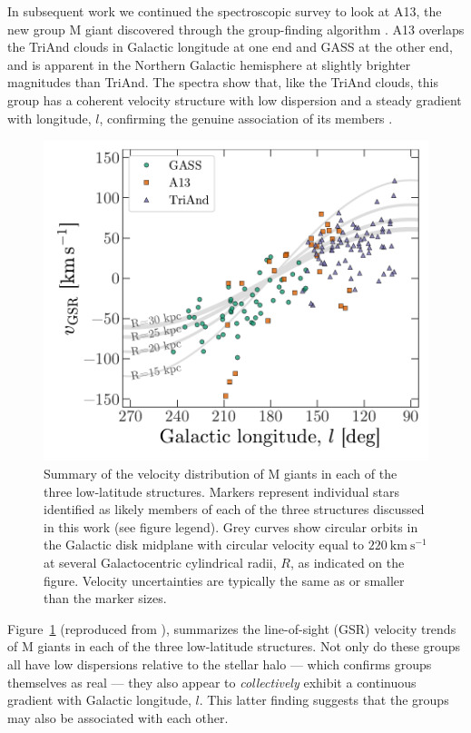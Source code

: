 \documentclass[galaxies,article,submit,moreauthors,pdftex,10pt,a4paper]{mdpi}
\newcommand{\kms}{\mathrm{km}~\mathrm{s}^{-1}}
\begin{document}
In subsequent work we continued the spectroscopic survey to look at A13, the new group M giant discovered through the group-finding algorithm \cite{sharma10}. A13 overlaps the TriAnd clouds in Galactic longitude at one end and GASS at the other end, and is apparent in the Northern Galactic hemisphere at slightly brighter magnitudes than TriAnd. The spectra show that, like the TriAnd clouds, this group has a coherent velocity structure with low dispersion and a steady gradient with longitude, $l$, confirming the genuine association of its members \cite{li17}.

\begin{figure}[!ht]
\centering
\includegraphics[width=5 in]{figures/vgsr.pdf}
\caption{\label{fig:ting_vel}
Summary of the velocity distribution of M giants in each of the three
low-latitude structures.
Markers represent individual stars identified as likely members of each of the
three structures discussed in this work (see figure legend).
Grey curves show circular orbits in the Galactic disk midplane with circular
velocity equal to $220~\kms$ at several Galactocentric cylindrical radii, $R$,
as indicated on the figure.
Velocity uncertainties are typically the same as or smaller than the marker
sizes.
}
\end{figure}


Figure~\ref{fig:ting_vel} (reproduced from \cite{li17}), summarizes the line-of-sight (GSR) velocity trends of M giants in each of the three low-latitude structures.
Not only do these groups all have low dispersions relative to the stellar halo
--- which confirms  groups themselves as real --- they also
appear to {\it collectively} exhibit a continuous gradient with Galactic longitude,
$l$.
This latter finding suggests that the groups may also be associated with each other.
\end{document}
